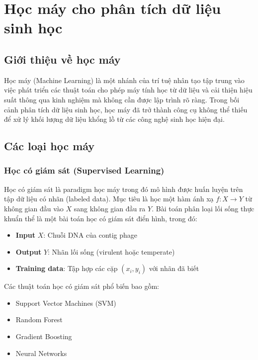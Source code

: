 \section{Học máy cho phân tích dữ liệu sinh học}
\label{sec:machine_learning}

\subsection{Giới thiệu về học máy}

Học máy (Machine Learning) là một nhánh của trí tuệ nhân tạo tập trung vào việc phát triển các thuật toán cho phép máy tính học từ dữ liệu và cải thiện hiệu suất thông qua kinh nghiệm mà không cần được lập trình rõ ràng. Trong bối cảnh phân tích dữ liệu sinh học, học máy đã trở thành công cụ không thể thiếu để xử lý khối lượng dữ liệu khổng lồ từ các công nghệ sinh học hiện đại.

\subsection{Các loại học máy}

\subsubsection{Học có giám sát (Supervised Learning)}

Học có giám sát là paradigm học máy trong đó mô hình được huấn luyện trên tập dữ liệu có nhãn (labeled data). Mục tiêu là học một hàm ánh xạ $f: X \rightarrow Y$ từ không gian đầu vào $X$ sang không gian đầu ra $Y$. Bài toán phân loại lối sống thực khuẩn thể là một bài toán học có giám sát điển hình, trong đó:

\begin{itemize}
    \item \textbf{Input} $X$: Chuỗi DNA của contig phage
    \item \textbf{Output} $Y$: Nhãn lối sống (virulent hoặc temperate)
    \item \textbf{Training data}: Tập hợp các cặp $(x_i, y_i)$ với nhãn đã biết
\end{itemize}

Các thuật toán học có giám sát phổ biến bao gồm:
\begin{itemize}
    \item Support Vector Machines (SVM)
    \item Random Forest
    \item Gradient Boosting
    \item Neural Networks
\end{itemize}

